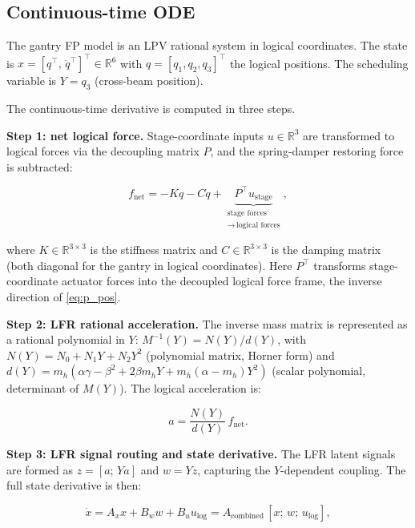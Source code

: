 \documentclass[11pt,a4paper]{article}
\begin{document}
\subsection{Continuous-time ODE}

The gantry FP model is an LPV rational system in logical coordinates.
The state is $x = [q^\top,\, \dot{q}^\top]^\top \in \mathbb{R}^6$
with $q = [q_1, q_2, q_3]^\top$ the logical positions.
The scheduling variable is $Y = q_3$ (cross-beam position).

The continuous-time derivative is computed in three steps.

\textbf{Step 1: net logical force.}
Stage-coordinate inputs $u \in \mathbb{R}^3$ are transformed to
logical forces via the decoupling matrix $P$, and the spring-damper
restoring force is subtracted:

\begin{equation}
  f_{\mathrm{net}} = -K q - C \dot{q}
    + \underbrace{P^\top u_{\mathrm{stage}}}_{\substack{\text{stage forces} \\ \to\,\text{logical forces}}},
  \label{eq:fnet}
\end{equation}

where $K \in \mathbb{R}^{3\times 3}$ is the stiffness matrix and
$C \in \mathbb{R}^{3\times 3}$ is the damping matrix (both diagonal for the
gantry in logical coordinates).
Here $P^\top$ transforms stage-coordinate actuator forces into the
decoupled logical force frame, the inverse direction of \eqref{eq:p_pos}.

\textbf{Step 2: LFR rational acceleration.}
The inverse mass matrix is represented as a rational polynomial in $Y$:
$M^{-1}(Y) = N(Y) / d(Y)$, with $N(Y) = N_0 + N_1 Y + N_2 Y^2$
(polynomial matrix, Horner form) and
$d(Y) = m_h(\alpha\gamma - \beta^2 + 2\beta m_h Y + m_h(\alpha - m_h)Y^2)$
(scalar polynomial, determinant of $M(Y)$).
The logical acceleration is:

\begin{equation}
  a = \frac{N(Y)}{d(Y)}\, f_{\mathrm{net}}.
  \label{eq:lfr_accel}
\end{equation}

\textbf{Step 3: LFR signal routing and state derivative.}
The LFR latent signals are formed as $z = [a;\, Ya]$ and
$w = Y z$, capturing the $Y$-dependent coupling.
The full state derivative is then:

\begin{equation}
  \dot{x} = A_x x + B_w w + B_u u_{\mathrm{log}}
           = A_{\mathrm{combined}}\, [x;\, w;\, u_{\mathrm{log}}],
  \label{eq:ode}
\end{equation}
\end{document}
